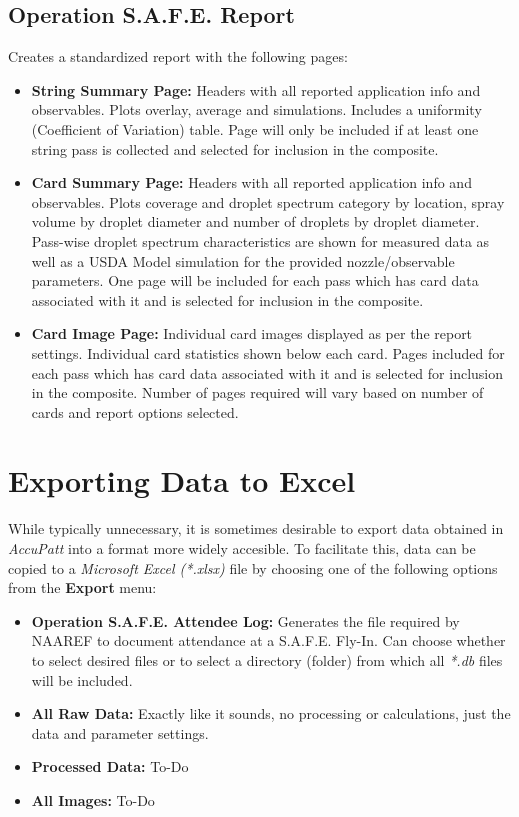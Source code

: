 \documentclass[10pt,letterpaper,titlepage]{article}
\begin{document}
    \subsection{Operation S.A.F.E. Report}
    Creates a standardized report with the following pages:
    \begin{itemize}
        \item \textbf{String Summary Page:} Headers with all reported application info and observables. Plots overlay, average and simulations. Includes a uniformity (Coefficient of Variation) table. Page will only be included if at least one string pass is collected and selected for inclusion in the composite.
        \item \textbf{Card Summary Page:} Headers with all reported application info and observables. Plots coverage and droplet spectrum category by location, spray volume by droplet diameter and number of droplets by droplet diameter. Pass-wise droplet spectrum characteristics are shown for measured data as well as a USDA Model simulation for the provided nozzle/observable parameters. One page will be included for each pass which has card data associated with it and is selected for inclusion in the composite.
        \item \textbf{Card Image Page:} Individual card images displayed as per the report settings. Individual card statistics shown below each card. Pages included for each pass which has card data associated with it and is selected for inclusion in the composite. Number of pages required will vary based on number of cards and report options selected.
    \end{itemize}
    \newpage

    \section{Exporting Data to Excel}
    While typically unnecessary, it is sometimes desirable to export data obtained in \textit{AccuPatt} into a format more widely accesible. To facilitate this, data can be copied to a \textit{Microsoft Excel (*.xlsx)} file by choosing one of the following options from the \textbf{Export} menu:
    \begin{itemize}
        \item \textbf{Operation S.A.F.E. Attendee Log:} Generates the file required by NAAREF to document attendance at a S.A.F.E. Fly-In. Can choose whether to select desired files or to select a directory (folder) from which all \textit{*.db} files will be included.
        \item \textbf{All Raw Data:} Exactly like it sounds, no processing or calculations, just the data and parameter settings.
        \item \textbf{Processed Data:} \color{red} To-Do \color{black}
        \item \textbf{All Images:} \color{red} To-Do \color{black}
    \end{itemize}
    \newpage
\end{document}
